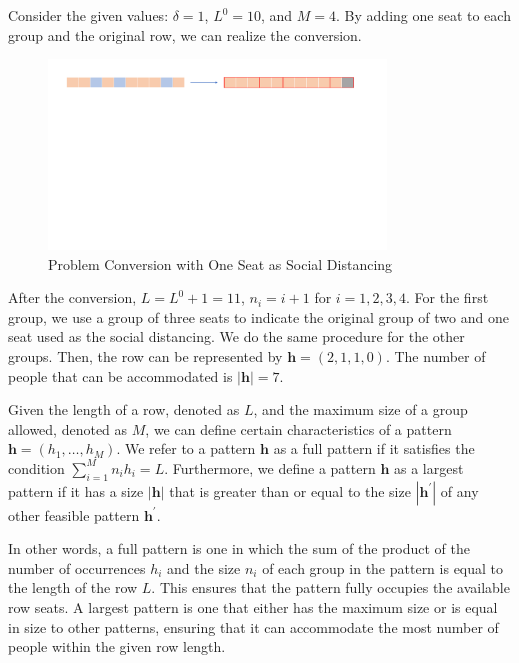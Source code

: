 \begin{example}
Consider the given values: $\delta = 1$, $L^{0} = 10$, and $M = 4$. By adding one seat to each group and the original row, we can realize the conversion.

\begin{figure}[ht]
    \centering
        \includegraphics[width=0.8\textwidth]{./Figures/dummy_seat.pdf}
    \caption{Problem Conversion with One Seat as Social Distancing}
\end{figure}

After the conversion, $L = L^{0} + 1 =11$, $n_i = i + 1$ for $i = 1, 2, 3, 4$. For the first group, we use a group of three seats to indicate the original group of two and one seat used as the social distancing. We do the same procedure for the other groups. Then, the row can be represented by $\bm{h} = (2,1,1,0)$. The number of people that can be accommodated is $|\bm{h}| = 7$.

\end{example}



\begin{definition}
Given the length of a row, denoted as $L$, and the maximum size of a group allowed, denoted as $M$, we can define certain characteristics of a pattern $\bm{h} = (h_1, \ldots, h_M)$.
We refer to a pattern $\bm{h}$ as a full pattern if it satisfies the condition $\sum_{i=1}^{M} n_i h_i = L$. Furthermore, we define a pattern $\bm{h}$ as a largest pattern if it has a size $|\bm{h}|$ that is greater than or equal to the size $|\bm{h}^{\prime}|$ of any other feasible pattern $\bm{h}^{\prime}$.
\end{definition}

In other words, a full pattern is one in which the sum of the product of the number of occurrences $h_i$ and the size $n_i$ of each group in the pattern is equal to the length of the row $L$. This ensures that the pattern fully occupies the available row seats. A largest pattern is one that either has the maximum size or is equal in size to other patterns, ensuring that it can accommodate the most number of people within the given row length.


